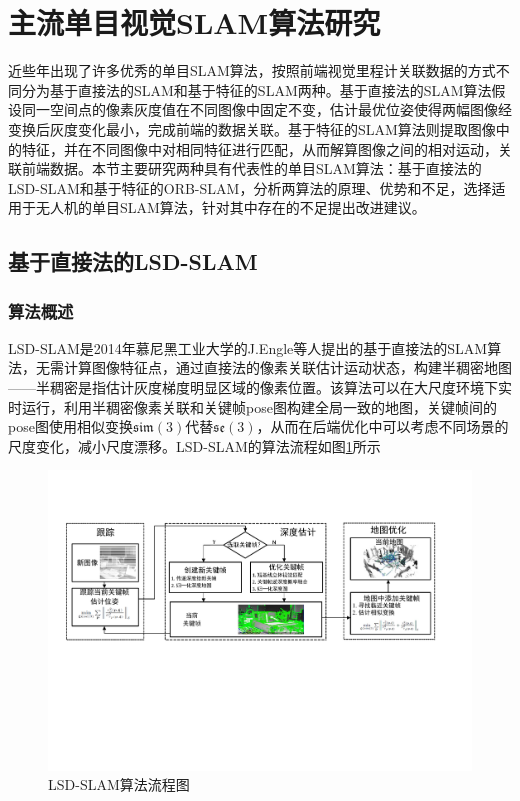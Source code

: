 \section{主流单目视觉SLAM算法研究}
近些年出现了许多优秀的单目SLAM算法，按照前端视觉里程计关联数据的方式不同分为基于直接法的SLAM和基于特征的SLAM两种。基于直接法的SLAM算法假设同一空间点的像素灰度值在不同图像中固定不变，估计最优位姿使得两幅图像经变换后灰度变化最小，完成前端的数据关联。基于特征的SLAM算法则提取图像中的特征，并在不同图像中对相同特征进行匹配，从而解算图像之间的相对运动，关联前端数据。本节主要研究两种具有代表性的单目SLAM算法：基于直接法的LSD-SLAM和基于特征的ORB-SLAM，分析两算法的原理、优势和不足，选择适用于无人机的单目SLAM算法，针对其中存在的不足提出改进建议。

\subsection{基于直接法的LSD-SLAM}

\subsubsection*{算法概述}
LSD-SLAM是2014年慕尼黑工业大学的J.Engle等人提出的基于直接法的SLAM算法，无需计算图像特征点，通过直接法的像素关联估计运动状态，构建半稠密地图——半稠密是指估计灰度梯度明显区域的像素位置。该算法可以在大尺度环境下实时运行，利用半稠密像素关联和关键帧pose图构建全局一致的地图，关键帧间的pose图使用相似变换$\mathfrak{sim}(3)$代替$\mathfrak{se}(3)$，从而在后端优化中可以考虑不同场景的尺度变化，减小尺度漂移。LSD-SLAM的算法流程如图\ref{fig3.4}所示

\begin{figure}[h]
\centering
\includegraphics[scale=0.5,angle=-90]{figures/Fig3-4.pdf}
\caption{LSD-SLAM算法流程图\upcite{[1.21]}}
\label{fig3.4}
\end{figure}

